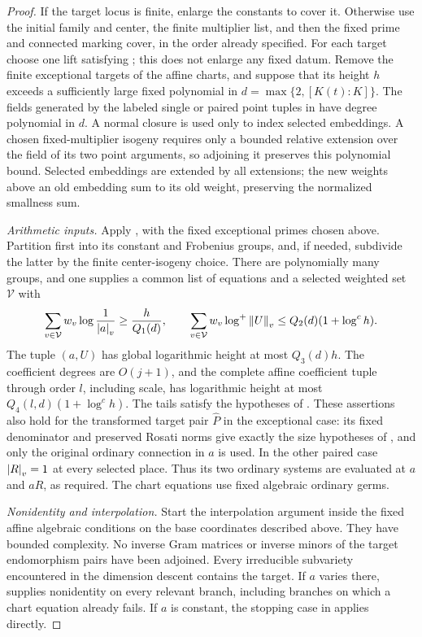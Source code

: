 \begin{proof}
If the target locus is finite, enlarge the constants to cover it.
Otherwise use the initial family and center, the finite multiplier list,
and then the fixed prime and connected marking cover, in the order already
specified.  For each target choose one lift satisfying
; this does not enlarge any fixed datum.  Remove the
finite exceptional targets of the affine charts, and suppose that its
height $h$ exceeds a sufficiently large fixed polynomial in
$d=\max\{2,[K(t):K]\}$.  The fields generated by the labeled single or paired point tuples in
 have degree polynomial in $d$.
A normal closure is used only to index selected embeddings.  A chosen
fixed-multiplier isogeny requires only a bounded relative extension over
the field of its two point arguments, so adjoining it preserves this
polynomial bound.  Selected embeddings are extended by all extensions;
the new weights above an old embedding sum to its old weight, preserving
the normalized smallness sum.

\emph{Arithmetic inputs.}
Apply , with the fixed exceptional primes
chosen above.  Partition first into its constant and Frobenius groups,
and, if needed, subdivide the latter by the finite center-isogeny choice.
There are polynomially many groups, and one supplies a common list of
equations and a selected weighted set $\mathcal V$ with
\[
 \sum_{v\in\mathcal V}w_v\log\frac1{\left\lvert a\right\rvert_v}
       \ge \frac{h}{Q_1(d)},\qquad
 \sum_{v\in\mathcal V}w_v\log^+\left\lVert U\right\rVert_v
       \le Q_2(d)(1+\log^c h).
\]
The tuple $(a,U)$ has global logarithmic height at most $Q_3(d)h$.
The coefficient degrees are $O(j+1)$, and the complete affine
coefficient tuple through order $l$, including scale, has logarithmic
height at most $Q_4(l,d)(1+\log^c h)$.  The tails satisfy the hypotheses
of .  These assertions also hold
for the transformed target pair $\widehat P$ in the exceptional case:
its fixed denominator and preserved Rosati norms give exactly the size
hypotheses of , and only the original ordinary
connection in $a$ is used.  In the other paired case $\left\lvert R\right\rvert_v=1$ at
every selected place.  Thus its two ordinary systems are evaluated at
$a$ and $aR$, as required.  The chart equations use fixed algebraic
ordinary germs.

\emph{Nonidentity and interpolation.}
Start the interpolation argument inside the fixed affine algebraic
conditions on the base coordinates described above.  They have bounded
complexity.  No inverse Gram matrices or inverse minors of the target
endomorphism pairs have been adjoined.  Every irreducible subvariety
encountered in the dimension descent contains the target.  If $a$ varies
there,  supplies nonidentity on every relevant
branch, including branches on which a chart equation already fails.
If $a$ is constant, the stopping case in
 applies directly.


\end{proof}
